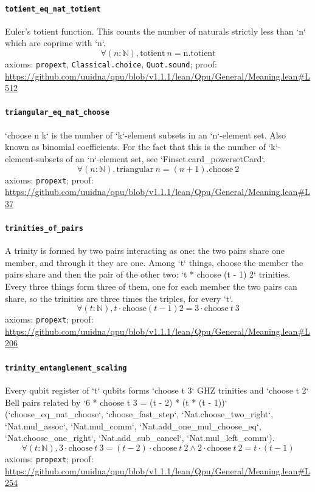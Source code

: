 \documentclass[11pt]{article}
\begin{document}
\paragraph{\texttt{totient\_eq\_nat\_totient}}
Euler's totient function. This counts the number of naturals strictly less than `n` which are coprime with `n`.
\[ \forall (n : \mathbb{N}), \mathrm{totient}\ n = \mathrm{n.totient} \]
\noindent axioms: \texttt{propext}, \texttt{Classical.choice}, \texttt{Quot.sound}; proof: \url{https://github.com/uuidna/qpu/blob/v1.1.1/lean/Qpu/General/Meaning.lean\#L512}

\paragraph{\texttt{triangular\_eq\_nat\_choose}}
`choose n k` is the number of `k`-element subsets in an `n`-element set. Also known as binomial coefficients. For the fact that this is the number of `k`-element-subsets of an `n`-element set, see `Finset.card\_powersetCard`.
\[ \forall (n : \mathbb{N}), \mathrm{triangular}\ n = (n + 1)\mathrm{.choose}\ 2 \]
\noindent axioms: \texttt{propext}; proof: \url{https://github.com/uuidna/qpu/blob/v1.1.1/lean/Qpu/General/Meaning.lean\#L37}

\paragraph{\texttt{trinities\_of\_pairs}}
A trinity is formed by two pairs interacting as one: the two pairs share one member, and through it they are one. Among `t` things, choose the member the pairs share and then the pair of the other two: `t * choose (t - 1) 2` trinities. Every three things form three of them, one for each member the two pairs can share, so the trinities are three times the triples, for every `t`.
\[ \forall (t : \mathbb{N}), t \cdot \mathrm{choose} (t - 1) 2 = 3 \cdot \mathrm{choose}\ t\ 3 \]
\noindent axioms: \texttt{propext}; proof: \url{https://github.com/uuidna/qpu/blob/v1.1.1/lean/Qpu/General/Meaning.lean\#L206}

\paragraph{\texttt{trinity\_entanglement\_scaling}}
Every qubit register of `t` qubits forms `choose t 3` GHZ trinities and `choose t 2` Bell pairs related by `6 * choose t 3 = (t - 2) * (t * (t - 1))` (`choose\_eq\_nat\_choose`, `choose\_fast\_step`, `Nat.choose\_two\_right`, `Nat.mul\_assoc`, `Nat.mul\_comm`, `Nat.add\_one\_mul\_choose\_eq`, `Nat.choose\_one\_right`, `Nat.add\_sub\_cancel`, `Nat.mul\_left\_comm`).
\[ \forall (t : \mathbb{N}), 3 \cdot \mathrm{choose}\ t\ 3 = (t - 2) \cdot \mathrm{choose}\ t\ 2 \land 2 \cdot \mathrm{choose}\ t\ 2 = t \cdot (t - 1) \]
\noindent axioms: \texttt{propext}; proof: \url{https://github.com/uuidna/qpu/blob/v1.1.1/lean/Qpu/General/Meaning.lean\#L254}
\end{document}
